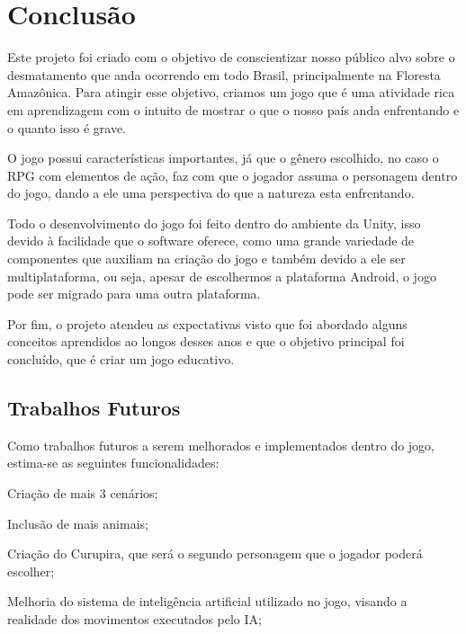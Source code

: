 \chapter{Conclusão}
\label{chap:conclusoes-e-trabalhos-futuros}

Este projeto foi criado com o objetivo de conscientizar nosso público alvo sobre o desmatamento que anda ocorrendo em todo Brasil, principalmente na Floresta Amazônica. Para atingir esse objetivo, criamos um jogo que é uma atividade rica em aprendizagem com o intuito de mostrar o que o nosso país anda enfrentando e o quanto isso é grave.

O jogo possui características importantes, já que o gênero escolhido, no caso o RPG com elementos de ação, faz com que o jogador assuma o personagem dentro do jogo, dando a ele uma perspectiva do que a natureza esta enfrentando.

Todo o desenvolvimento do jogo foi feito dentro do ambiente da Unity, isso devido à facilidade que o software oferece, como uma grande variedade de componentes que auxiliam na criação do jogo e também devido a ele ser multiplataforma, ou seja, apesar de escolhermos a plataforma Android, o jogo pode ser migrado para uma outra plataforma.

Por fim, o projeto atendeu as expectativas visto que foi abordado alguns conceitos aprendidos ao longos desses anos e que o objetivo principal foi concluído, que é criar um jogo educativo.


\section{Trabalhos Futuros}
\label{sec:trabalhos-futuros}

Como trabalhos futuros a serem melhorados e implementados dentro do jogo, estima-se as seguintes funcionalidades:

\begin{alineascomponto}
	
   \item Criação de mais 3 cenários;
   \item Inclusão de mais animais;
   \item Criação do Curupira, que será o segundo personagem que o jogador poderá escolher;
   \item Melhoria do sistema de inteligência artificial utilizado no jogo, visando a realidade dos movimentos executados pelo IA;

	\end{alineascomponto}